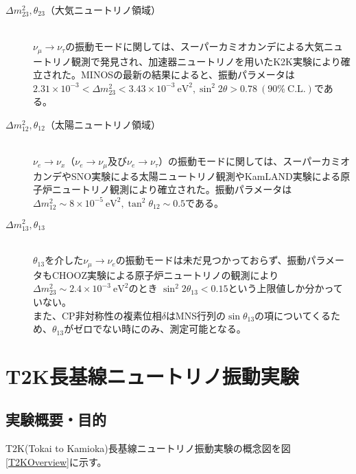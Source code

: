 \documentclass[11pt]{jreport}
\newcommand{\figref}[1]{図\ref{#1}}
\begin{document}
\begin{description}
\item[$\Delta m_{23}^{2}, \theta_{23}$（大気ニュートリノ領域）]\mbox{}\\%
 $\nu_{\mu} \rightarrow \nu_{\tau}$の振動モードに関しては、スーパーカミオカンデによる大気ニュートリノ観測\cite{sk_solar}で発見され、加速器ニュートリノを用いたK2K実験\cite{k2k}により確立された。MINOSの最新の結果\cite{minos}によると、振動パラメータは$2.31\times10^{-3} < \Delta m_{23}^{2} < 3.43 \times 10^{-3}\ \mathrm{eV^{2}},  \sin^{2}2\theta > 0.78\ (90 \%\ \mathrm{C.L.})$である。
%
\item [$\Delta m_{12}^{2}, \theta_{12}$（太陽ニュートリノ領域）]\mbox{}\\%
$\nu_{e} \rightarrow \nu_{x}$（$\nu_{e}\rightarrow \nu_{\mu}$及び$\nu_{e}\rightarrow \nu_{\tau}$）の振動モードに関しては、スーパーカミオカンデ\cite{sk-solar}やSNO実験\cite{sno}による太陽ニュートリノ観測やKamLAND実験\cite{kamland}による原子炉ニュートリノ観測により確立された。振動パラメータは$\Delta m_{12}^{2} \sim 8 \times 10^{-5}\ \mathrm{eV^{2}}, \tan^{2}\theta_{12} \sim 0.5$である。
%
\item[$\Delta m_{13}^{2}, \theta_{13}$]\mbox{}\\%
 $\theta_{13}$を介した$\nu_{\mu}\rightarrow \nu_{e}$の振動モードは未だ見つかっておらず、振動パラメータもCHOOZ実験による原子炉ニュートリノの観測\cite{chooz}により$\Delta m_{23}^{2} \sim 2.4 \times 10^{-3}\ \mathrm{eV^{2}}$のとき $\sin^{2}2\theta_{13} < 0.15$という上限値しか分かっていない。\\
また、CP非対称性の複素位相$\delta$はMNS行列の$\sin\theta_{13}$の項についてくるため、$\theta_{13}$がゼロでない時にのみ、測定可能となる。
\end{description}






\chapter{T2K長基線ニュートリノ振動実験}


\section{実験概要・目的}
T2K(Tokai to Kamioka)長基線ニュートリノ振動実験の概念図を\figref{T2KOverview}に示す。
\end{document}
